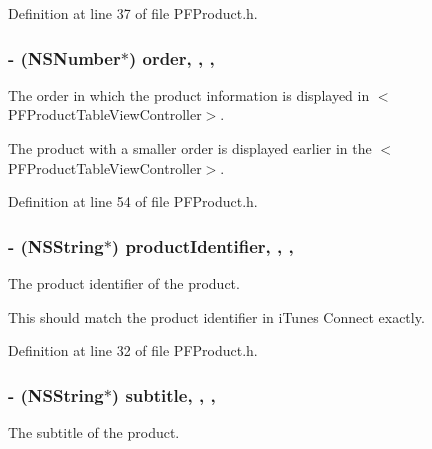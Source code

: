 Definition at line 37 of file P\+F\+Product.\+h.

\hypertarget{interface_p_f_product_a8e78e9f4607e77954c425698ec7a151f}{}
\subsubsection[{order}]{\setlength{\rightskip}{0pt plus 5cm}-\/ (N\+S\+Number$\ast$) order\hspace{0.3cm}{\ttfamily [read]}, {\ttfamily [write]}, {\ttfamily [nonatomic]}, {\ttfamily [strong]}}\label{interface_p_f_product_a8e78e9f4607e77954c425698ec7a151f}
The order in which the product information is displayed in $<$\+P\+F\+Product\+Table\+View\+Controller$>$.

The product with a smaller order is displayed earlier in the $<$\+P\+F\+Product\+Table\+View\+Controller$>$. 

Definition at line 54 of file P\+F\+Product.\+h.

\hypertarget{interface_p_f_product_a354f59da62a2d695096b10f36e75a084}{}
\subsubsection[{product\+Identifier}]{\setlength{\rightskip}{0pt plus 5cm}-\/ (N\+S\+String$\ast$) product\+Identifier\hspace{0.3cm}{\ttfamily [read]}, {\ttfamily [write]}, {\ttfamily [nonatomic]}, {\ttfamily [strong]}}\label{interface_p_f_product_a354f59da62a2d695096b10f36e75a084}
The product identifier of the product.

This should match the product identifier in i\+Tunes Connect exactly. 

Definition at line 32 of file P\+F\+Product.\+h.

\hypertarget{interface_p_f_product_a83e9bd4db5d395daf5d7d61094d0293d}{}
\subsubsection[{subtitle}]{\setlength{\rightskip}{0pt plus 5cm}-\/ (N\+S\+String$\ast$) subtitle\hspace{0.3cm}{\ttfamily [read]}, {\ttfamily [write]}, {\ttfamily [nonatomic]}, {\ttfamily [strong]}}\label{interface_p_f_product_a83e9bd4db5d395daf5d7d61094d0293d}
The subtitle of the product. 

